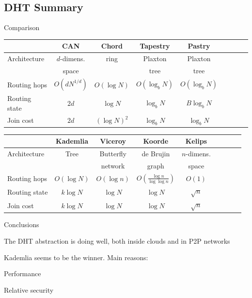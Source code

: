 \subsection{DHT Summary}

\begin{frame}{Comparison}

\begin{table}
\begin{tabular}{|l||c|c|c|c|c|c|c|c|}
\hline
   & \textbf{CAN} & \textbf{Chord} & \textbf{Tapestry} & \textbf{Pastry}  \\
\hline\hline
Architecture & $d$-dimens. & ring & Plaxton & Plaxton \\
             & space           &      & tree    & tree  \\
\hline
Routing hops & $O(dN^{1/d})$ & $O(\log N)$ & $O(\log_b N)$ & $O(\log_b N)$ \\
\hline
Routing state & $2d$ & $\log N$ & $\log_b N$ & $B\log_b N$\\
\hline
Join cost & $2d$ & $(\log N)^2$ & $\log_b N$ & $\log_b N$ \\
\hline
\end{tabular}
\end{table}

\begin{table}
\begin{tabular}{|l||c|c|c|c|c|c|c|c|}
\hline
   & \textbf{Kademlia} & \textbf{Viceroy} & \textbf{Koorde} & \textbf{Kelips} \\
\hline\hline
Architecture & Tree & Butterfly & de Brujin & $n$-dimens. \\
             &      & network   & graph     & space \\
\hline
Routing hops & $O(\log N)$ & $O(\log n)$ & $O\left(\frac{\log n}{\log \log n}\right)$ & $O(1)$ \\
\hline
Routing state & $k\log N$ & $\log N$ & $\log N$ & $\sqrt{n}$ \\
\hline
Join cost & $k \log N$ & $\log N$ & $\log N$ & $\sqrt{n}$ \\
\hline
\end{tabular}
\end{table}

\end{frame}

\begin{frame}{Conclusions}

\BIL
\item The DHT abstraction is doing well, both inside clouds and in 
P2P networks
\item Kademlia seems to be the winner. Main reasons:
\BI
\item Performance
\item Relative security
\EI
\EIL

\end{frame}



